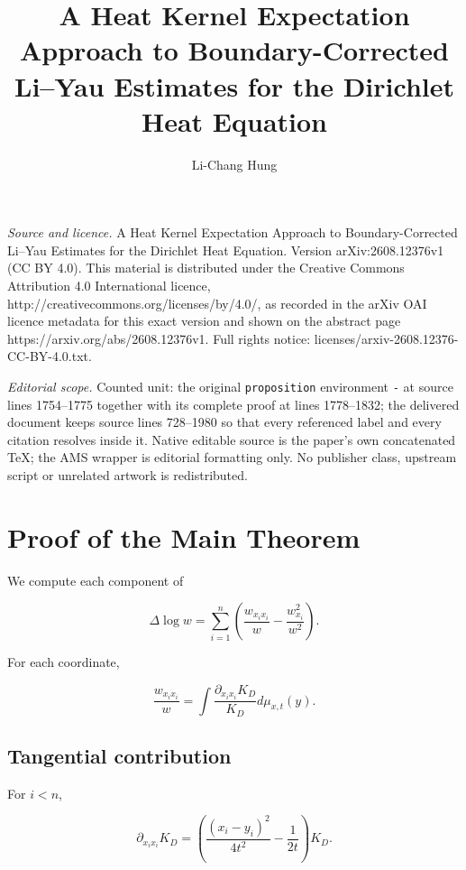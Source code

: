 \documentclass[10pt,a4paper]{amsart}
\begin{document}
\title[A Heat Kernel Expectation Approach to Boundary-Corrected Li-]{A Heat Kernel Expectation Approach to Boundary-Corrected Li--Yau Estimates for the Dirichlet Heat Equation}
\author{Li-Chang Hung}
\date{}
\maketitle
\noindent\emph{Source and licence.} A Heat Kernel Expectation Approach to Boundary-Corrected Li--Yau Estimates for the Dirichlet Heat Equation. Version arXiv:2608.12376v1 (CC BY 4.0). This material is distributed under the Creative Commons Attribution 4.0 International licence, http://creativecommons.org/licenses/by/4.0/, as recorded in the arXiv OAI licence metadata for this exact version and shown on the abstract page https://arxiv.org/abs/2608.12376v1. Full rights notice: licenses/arxiv-2608.12376-CC-BY-4.0.txt.\par\smallskip
\noindent\textit{Editorial scope.} Counted unit: the original \texttt{proposition} environment \texttt{-} at source lines 1754--1775 together with its complete proof at lines 1778--1832; the delivered document keeps source lines 728--1980 so that every referenced label and every citation resolves inside it. Native editable source is the paper's own concatenated TeX; the AMS wrapper is editorial formatting only. No publisher class, upstream script or unrelated artwork is redistributed.
\section{Proof of the Main Theorem}


We compute each component of

\[
\Delta\log w
=
\sum_{i=1}^{n}
\left(
\frac{w_{x_ix_i}}w
-
\frac{w_{x_i}^2}{w^2}
\right).
\]


For each coordinate,

\[
\frac{w_{x_ix_i}}w
=
\int
\frac{\partial_{x_ix_i}K_D}
{K_D}
d\mu_{x,t}(y).
\]



\subsection{Tangential contribution}


For $i<n$,

\[
\partial_{x_ix_i}K_D
=
\left(
\frac{(x_i-y_i)^2}{4t^2}
-\frac1{2t}
\right)K_D .
\]
\end{document}
